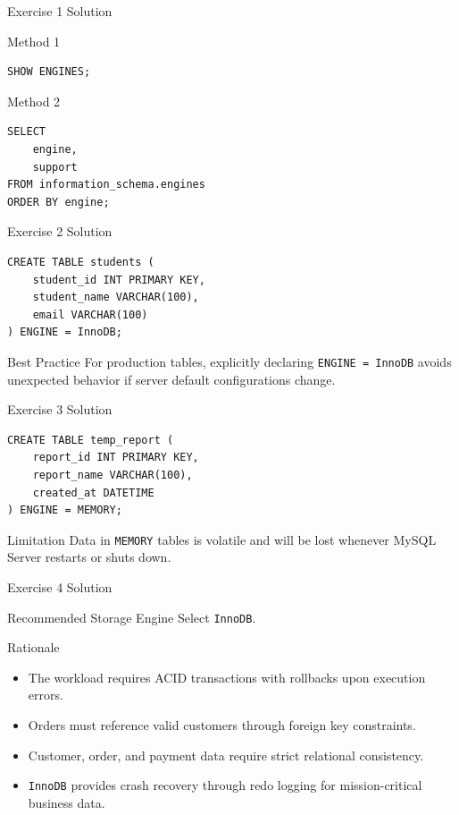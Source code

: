 \documentclass[aspectratio=169,11pt]{beamer}
\newcommand{\code}[1]{\texttt{#1}}
\newcommand{\smallitem}{\setlength{\itemsep}{2pt}}
\begin{document}
\begin{frame}[fragile]{Exercise 1 Solution}
\begin{block}{Method 1}
\begin{lstlisting}
SHOW ENGINES;
\end{lstlisting}
\end{block}
\begin{block}{Method 2}
\begin{lstlisting}
SELECT
    engine,
    support
FROM information_schema.engines
ORDER BY engine;
\end{lstlisting}
\end{block}
\end{frame}

\begin{frame}[fragile]{Exercise 2 Solution}
\begin{lstlisting}
CREATE TABLE students (
    student_id INT PRIMARY KEY,
    student_name VARCHAR(100),
    email VARCHAR(100)
) ENGINE = InnoDB;
\end{lstlisting}
\begin{block}{Best Practice}
For production tables, explicitly declaring \code{ENGINE = InnoDB} avoids unexpected behavior if server default configurations change.
\end{block}
\end{frame}

\begin{frame}[fragile]{Exercise 3 Solution}
\begin{lstlisting}
CREATE TABLE temp_report (
    report_id INT PRIMARY KEY,
    report_name VARCHAR(100),
    created_at DATETIME
) ENGINE = MEMORY;
\end{lstlisting}
\begin{alertblock}{Limitation}
Data in \code{MEMORY} tables is volatile and will be lost whenever MySQL Server restarts or shuts down.
\end{alertblock}
\end{frame}

\begin{frame}{Exercise 4 Solution}
\begin{block}{Recommended Storage Engine}
Select \code{InnoDB}.
\end{block}
\begin{block}{Rationale}
\begin{itemize}\smallitem
  \item The workload requires ACID transactions with rollbacks upon execution errors.
  \item Orders must reference valid customers through foreign key constraints.
  \item Customer, order, and payment data require strict relational consistency.
  \item \code{InnoDB} provides crash recovery through redo logging for mission-critical business data.
\end{itemize}
\end{block}
\end{frame}
\end{document}
